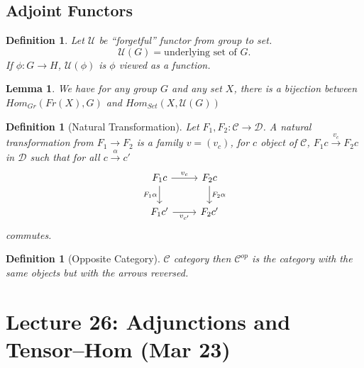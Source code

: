 \documentclass[a4paper,12pt]{article}
\newtheorem{lem}[thm]{Lemma}
\newtheorem{defn}[thm]{Definition}
\begin{document}
\subsection{Adjoint Functors}
\begin{defn}
    Let $\mathcal{U}$ be ``forgetful'' functor from group to set. 
    \[
    \mathcal{U}(G)= \text{underlying set of } G
    .\] 
    If $\phi:G\to H$, $\mathcal{U}(\phi)$ is $\phi$ viewed as a function. 
\end{defn}
\begin{lem}
    We have for any group $G$ and any set $X$, there is a bijection between $Hom_{Gr}(Fr(X),G)$ and $Hom_{Set}(X,\mathcal{U}(G))$
\end{lem}
\begin{defn}[Natural Transformation]
    Let $F_1,F_2:\mathcal{C}\to \mathcal{D}$. A natural transformation from $F_1\to F_2$ is a family $v=(v_c)$, for $c$ object of $\mathcal{C}$,  $F_1c\xrightarrow{v_c} F_2c$ in $\mathcal{D}$ such that for all $c\xrightarrow{\alpha} c'$
    \[
    \begin{tikzcd}
        F_1c \arrow[r, "v_c"] \arrow[d, "F_1\alpha"'] & F_2c \arrow[d, "F_2\alpha"] \\
        F_1c' \arrow[r, "v_{c'}"'] & F_2c'
    \end{tikzcd}
    \]
    commutes. 
\end{defn}
\begin{defn}[Opposite Category]
    $\mathcal{C}$ category then $\mathcal{C}^{op}$ is the category with the same objects but with the arrows reversed. 
\end{defn}
\newpage
\section{Lecture 26: Adjunctions and Tensor--Hom (Mar 23)}
\end{document}
